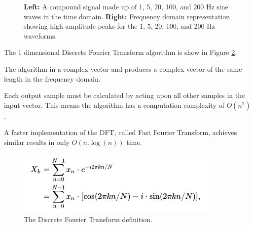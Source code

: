 \documentclass[11pt,a4paper]{article}
\begin{document}
\begin{figure}[H]%
    \centering
    \qquad
    \vspace{5pt}
    \caption{\textbf{Left:} A compound signal made up of 1, 5, 20, 100, and 200 Hz sine waves in the time domain. \textbf{Right:} Frequency domain representation showing high amplitude peaks for the 1, 5, 20, 100, and 200 Hz waveforms.}%
    \label{fig:gridwatch}%
\end{figure}

The 1 dimensional Discrete Fourier Transform algorithm is show in Figure \ref{fig:dft_algorithm}.

The algorithm in a complex vector and produces a complex vector of the same length in the frequency domain.

Each output sample must be calculated by acting upon all other samples in the input vector. This means the algorithm has a computation complexity of $O(n^2)$.

A faster implementation of the DFT, called Fast Fourier Transform, achieves similar results in only $O(n.\log(n))$ time.

\begin{figure}[H]
\begin{center}
\includegraphics[scale=1]{dft_algorithm}
\end{center}
\caption{The Discrete Fourier Transform definition.}
\label{fig:dft_algorithm}
\end{figure}
\end{document}
